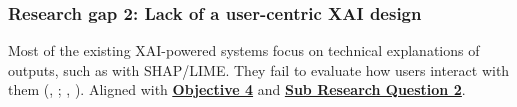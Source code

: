 
\subsubsection*{Research gap 2: Lack of a user-centric XAI design}\label{research-gap-2}
Most of the existing XAI-powered systems focus on technical explanations of outputs, such as with SHAP/LIME. They fail to evaluate how users interact with them (\citeauthor{vo2024securing}, \citeyear{vo2024securing}; \citeauthor{anderson2015polymorphic}, \citeyear{anderson2015polymorphic}). Aligned with \hyperref[objective-4]{\uline{\textbf{Objective 4}}} and \hyperref[sub-research-q2]{\uline{\textbf{Sub Research Question 2}}}.

